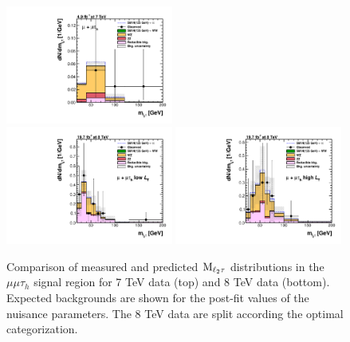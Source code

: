 \begin{figure}
\begin{center}
  \includegraphics[width=0.49\textwidth]{4_Analisys/pics/postfit/mmt_postfit_7TeV_FitAllChannels.pdf}\\
  \includegraphics[width=0.49\textwidth]{4_Analisys/pics/postfit/mmt_low_postfit_8TeV_FitAllChannels.pdf}
  \includegraphics[width=0.49\textwidth]{4_Analisys/pics/postfit/mmt_high_postfit_8TeV_FitAllChannels.pdf}\\
  \caption{Comparison of measured and predicted $\rm{M}_{\ell_2\tau}$ distributions in the $\mu\mu\tau_h$ signal region for 7 TeV data (top) and 8 TeV data (bottom). 
  Expected backgrounds are shown for the post-fit values of the nuisance parameters. 
  The 8 TeV data are split according the optimal categorization.}
  \label{fig:LLT_mmt_postfit}
\end{center}
\end{figure}


